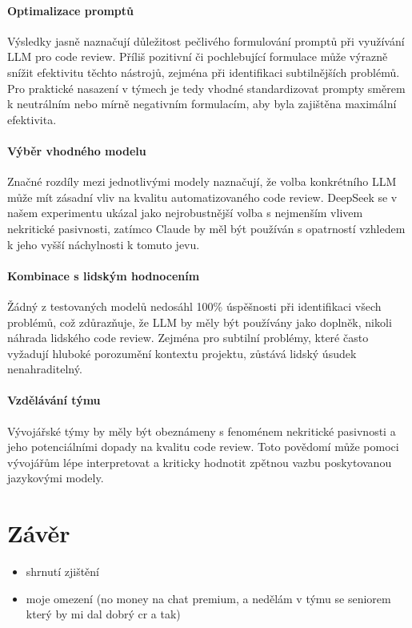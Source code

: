 \documentclass[12pt, a4paper]{article}
\begin{document}
\paragraph{Optimalizace promptů} Výsledky jasně naznačují důležitost pečlivého formulování promptů při využívání LLM pro code review. Příliš pozitivní či pochlebující formulace může výrazně snížit efektivitu těchto nástrojů, zejména při identifikaci subtilnějších problémů. Pro praktické nasazení v týmech je tedy vhodné standardizovat prompty směrem k neutrálním nebo mírně negativním formulacím, aby byla zajištěna maximální efektivita.

\paragraph{Výběr vhodného modelu} Značné rozdíly mezi jednotlivými modely naznačují, že volba konkrétního LLM může mít zásadní vliv na kvalitu automatizovaného code review. DeepSeek se v našem experimentu ukázal jako nejrobustnější volba s nejmenším vlivem nekritické pasivnosti, zatímco Claude by měl být používán s opatrností vzhledem k jeho vyšší náchylnosti k tomuto jevu.

\paragraph{Kombinace s lidským hodnocením} Žádný z testovaných modelů nedosáhl 100\% úspěšnosti při identifikaci všech problémů, což zdůrazňuje, že LLM by měly být používány jako doplněk, nikoli náhrada lidského code review. Zejména pro subtilní problémy, které často vyžadují hluboké porozumění kontextu projektu, zůstává lidský úsudek nenahraditelný.

\paragraph{Vzdělávání týmu} Vývojářské týmy by měly být obeznámeny s fenoménem nekritické pasivnosti a jeho potenciálními dopady na kvalitu code review. Toto povědomí může pomoci vývojářům lépe interpretovat a kriticky hodnotit zpětnou vazbu poskytovanou jazykovými modely.

\section{Závěr}
\begin{itemize}
  \item shrnutí zjištění
  \item moje omezení (no money na chat premium, a nedělám v týmu se seniorem který by mi dal dobrý cr a tak)
\end{itemize}



\end{document}

